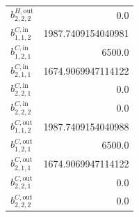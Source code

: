 \documentclass{article}%
\begin{document}
\begin{multicols*}{3}
\begin{supertabular}{lr}
	$b_{2,2,2}^{H,\text{out}}$ & 0.0 \\%
	$b_{1,1,2}^{C,\text{in}}$ & 1987.7409154040981 \\%
	$b_{1,2,1}^{C,\text{in}}$ & 6500.0 \\%
	$b_{2,1,1}^{C,\text{in}}$ & 1674.9069947114122 \\%
	$b_{2,2,1}^{C,\text{in}}$ & 0.0 \\%
	$b_{2,2,2}^{C,\text{in}}$ & 0.0 \\%
	$b_{1,1,2}^{C,\text{out}}$ & 1987.7409154040988 \\%
	$b_{1,2,1}^{C,\text{out}}$ & 6500.0 \\%
	$b_{2,1,1}^{C,\text{out}}$ & 1674.9069947114122 \\%
	$b_{2,2,1}^{C,\text{out}}$ & 0.0 \\%
	$b_{2,2,2}^{C,\text{out}}$ & 0.0 \\%
\end{supertabular}%
\end{multicols*}%
\end{document}
